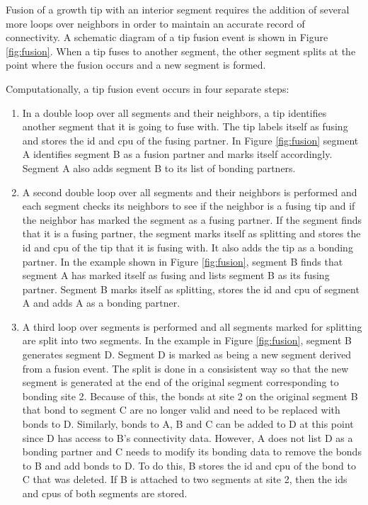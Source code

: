 \documentclass[12pt]{article}
\begin{document}
Fusion of a growth tip with an interior segment requires the addition of several more loops
over neighbors in order to maintain an accurate record of connectivity. A schematic diagram
of a tip fusion event is shown in Figure \ref{fig:fusion}. When a tip fuses to another segment,
the other segment splits at the point where the fusion occurs and a new segment
is formed.

Computationally, a tip fusion event occurs in four separate steps:
\begin{enumerate}
\item In a double loop over all segments and their neighbors, a tip identifies another segment
that it is going to fuse with. The tip labels itself as fusing and stores the id and cpu of the
fusing partner. In Figure \ref{fig:fusion} segment A identifies segment B as a fusion partner
and marks itself accordingly. Segment A also adds segment B to its list of
bonding partners.
\item A second double loop over all segments and their neighbors is performed and each segment
checks its neighbors to see if the neighbor is a fusing tip and if the neighbor has marked the
segment as a fusing
partner. If the segment finds that it is a fusing partner, the segment marks itself as
splitting and
stores the id and cpu of the tip that it is fusing with. It also adds the tip as a bonding
partner. In the example shown in Figure \ref{fig:fusion}, segment B finds that segment A has
marked itself as fusing and lists segment B as its fusing partner. Segment B marks itself as
splitting, stores the id and cpu of segment A and adds A as a bonding partner.
\item A third loop over segments is performed and all segments marked for splitting are split
into two segments. In the example in Figure \ref{fig:fusion}, segment B generates segment D.
Segment D is marked as being a new segment derived from a fusion event.
The split is done in a consisistent way so that the new segment is generated at the end of the
original segment corresponding to bonding site 2. Because of this, the bonds at site 2 on the
original segment B that bond to segment C are no longer valid and need to be replaced with bonds to D.
Similarly, bonds to A, B and C can be added to D at this point since D has access to B's
connectivity data. However, A does not list D as a bonding partner and C needs to modify its
bonding data to remove the bonds to B and add bonds to D. To do this, B stores the id and cpu
of the bond to C that was deleted. If B is attached to two segments at site 2, then the ids and
cpus of both segments are stored.


\end{enumerate}
\end{document}
